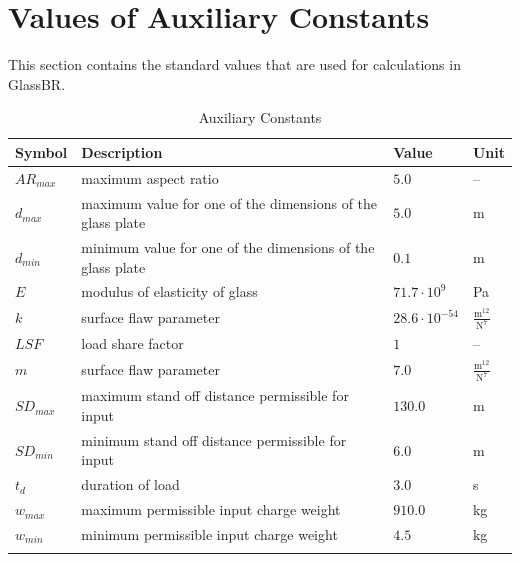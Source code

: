 \documentclass[12pt]{article}
\begin{document}
\section{Values of Auxiliary Constants}
\label{Sec:AuxConstants}
This section contains the standard values that are used for calculations in GlassBR.
\begin{longtabu}{l X[l] l l}
\toprule
Symbol & Description & Value & Unit
\\
\midrule
\endhead
${AR_{max}}$ & maximum aspect ratio & $5.0$ & --
\\
${d_{max}}$ & maximum value for one of the dimensions of the glass plate & $5.0$ & m
\\
${d_{min}}$ & minimum value for one of the dimensions of the glass plate & $0.1$ & m
\\
$E$ & modulus of elasticity of glass & $71.7\cdot{}10^{9}$ & Pa
\\
$k$ & surface flaw parameter & $28.6\cdot{}10^{-54}$ & $\frac{\text{m}^{12}}{\text{N}^{7}}$
\\
$LSF$ & load share factor & $1$ & --
\\
$m$ & surface flaw parameter & $7.0$ & $\frac{\text{m}^{12}}{\text{N}^{7}}$
\\
${SD_{max}}$ & maximum stand off distance permissible for input & $130.0$ & m
\\
${SD_{min}}$ & minimum stand off distance permissible for input & $6.0$ & m
\\
${t_{d}}$ & duration of load & $3.0$ & s
\\
${w_{max}}$ & maximum permissible input charge weight & $910.0$ & kg
\\
${w_{min}}$ & minimum permissible input charge weight & $4.5$ & kg
\\
\bottomrule
\caption{Auxiliary Constants}
\label{Table:TAuxConsts}
\end{longtabu}
\end{document}

